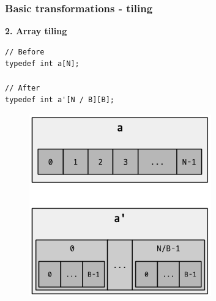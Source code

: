 \begin{frame}[fragile]
\frametitle{Basic transformations - tiling}

\begin{center}
\begin{minipage}{0.3\linewidth}
\textbf{\small 2. Array tiling}
\begin{lstlisting}[style=Cstyle, basicstyle=\scriptsize]
// Before
typedef int a[N];

// After
typedef int a'[N / B][B];
\end{lstlisting}
\end{minipage}%
\begin{minipage}{0.5\linewidth}
\begin{figure}
	\centering
	\includegraphics[width=0.7\textwidth]{images/tiling}
\end{figure}
\end{minipage}
\end{center}

\end{frame}


